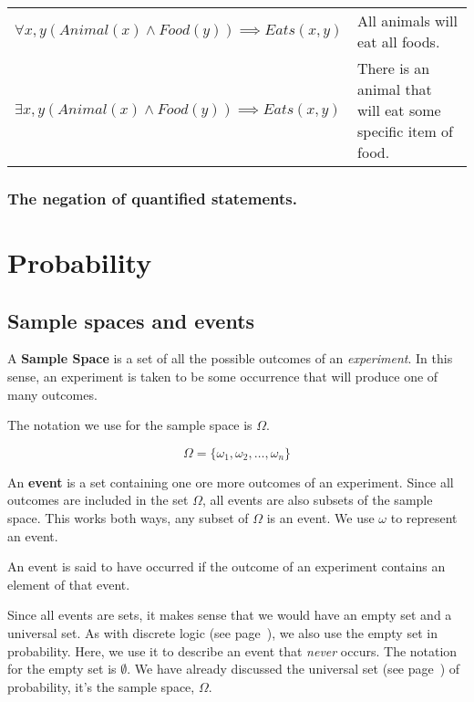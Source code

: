 \begin{tabularx}{\textwidth}{l X}
	$\forall x, y \left(Animal(x) \wedge Food(y)\right) \implies Eats(x, y)$ & All animals will eat all foods.\\
	$\exists x, y \left(Animal(x) \wedge Food(y)\right) \implies Eats(x, y)$ & There is an animal that will eat some specific item of food.\\
\end{tabularx}

\subsubsection{The negation of quantified statements.}

\section{Probability}

\subsection{Sample spaces and events}

A {\bf Sample Space} is a set of all the possible outcomes of an {\it
experiment}. In this sense, an experiment is taken to be some occurrence that
will produce one of many outcomes.

The notation we use for the sample space is $\Omega$.

\begin{dmath*}
	\Omega = \{\omega_1, \omega_2, \ldots, \omega_n\}
\end{dmath*}

An {\bf event} is a set containing one ore more outcomes of an experiment. Since
all outcomes are included in the set $\Omega$, all events are also subsets of
the sample space. This works both ways, any subset of $\Omega$ is an event. We
use $\omega$ to represent an event.

An event is said to have occurred if the outcome of an experiment contains an
element of that event.

Since all events are sets, it makes sense that we would have an empty set and a
universal set. As with discrete logic (see page~\pageref{subsubsec:empty_set}),
we also use the empty set in probability. Here, we use it to describe an event
that {\it never} occurs. The notation for the empty set is $\emptyset$. We have
already discussed the universal set (see page~\pageref{subsubsec:universal_set})
of probability, it's the sample space, $\Omega$.

